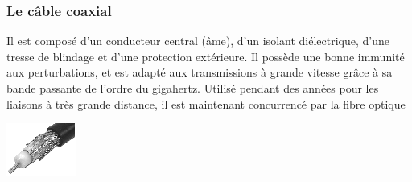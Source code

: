 \documentclass[10pt]{article}
\begin{document}
\subsubsection*{Le câble coaxial}
\begin{minipage}[c]{.78\linewidth}
Il est composé d’un conducteur central (âme), d’un isolant diélectrique, d’une tresse de blindage et d’une protection extérieure. Il possède une bonne immunité aux perturbations, et est adapté aux transmissions à grande vitesse grâce à sa bande passante de l’ordre du gigahertz. Utilisé pendant des années pour les liaisons à très grande distance, il est maintenant concurrencé par la fibre optique
\end{minipage} \hfill
\begin{minipage}[c]{.2\linewidth}
\begin{center}
\includegraphics[width=.95\textwidth]{images/fig_09}
\end{center}
\end{minipage} 
\end{document}
